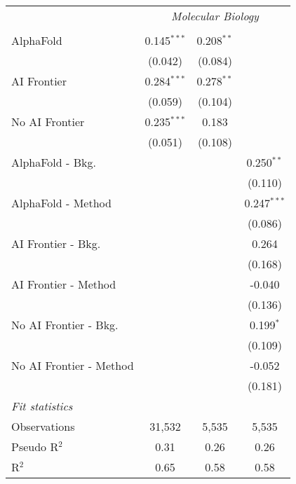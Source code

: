 \begin{tabular}{lccc}
 & \multicolumn{3}{c}{\textit{Molecular Biology}} \\ \\
   AlphaFold               & 0.145$^{***}$ & 0.208$^{**}$ &   \\   
                           & (0.042)       & (0.084)      &   \\   
   AI Frontier             & 0.284$^{***}$ & 0.278$^{**}$ &   \\   
                           & (0.059)       & (0.104)      &   \\   
   No AI Frontier          & 0.235$^{***}$ & 0.183        &   \\   
                           & (0.051)       & (0.108)      &   \\   
   AlphaFold - Bkg.        &               &              & 0.250$^{**}$\\   
                           &               &              & (0.110)\\   
   AlphaFold - Method      &               &              & 0.247$^{***}$\\   
                           &               &              & (0.086)\\   
   AI Frontier - Bkg.      &               &              & 0.264\\   
                           &               &              & (0.168)\\   
   AI Frontier - Method    &               &              & -0.040\\   
                           &               &              & (0.136)\\   
   No AI Frontier - Bkg.   &               &              & 0.199$^{*}$\\   
                           &               &              & (0.109)\\   
   No AI Frontier - Method &               &              & -0.052\\   
                           &               &              & (0.181)\\   
   \midrule
   \emph{Fit statistics}\\
   Observations            & 31,532        & 5,535        & 5,535\\  
   Pseudo R$^2$            & 0.31          & 0.26         & 0.26\\  
   R$^2$                   & 0.65          & 0.58         & 0.58\\  
   

\end{tabular}
